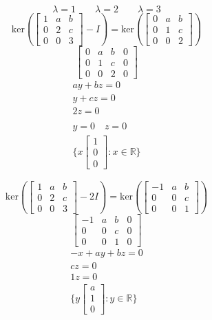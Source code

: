 \documentclass[hidelinks]{article}
\begin{document}
\[
	\lambda = 1 \quad \quad \lambda = 2 \quad \quad \lambda = 3
\]
\[
	\text{ker}(\begin{bmatrix} 1 & a & b \\ 0 & 2 & c \\ 0 & 0 & 3\end{bmatrix} - I) = \text{ker}(\begin{bmatrix} 0 & a & b \\ 0 & 1 & c \\ 0 & 0 & 2\end{bmatrix}) 
\]
\[
	\begin{bmatrix} 0 & a & b & 0 \\ 0 & 1 & c & 0\\ 0 & 0 & 2 & 0\end{bmatrix}
\]
\begin{align*}
	ay + bz = 0 \\
	y + cz = 0 \\
	2z = 0 \\
	\\
	y= 0 \quad z = 0 \\
	\{x \begin{bmatrix} 1 \\ 0 \\  0 \end{bmatrix} : x \in \mathbb{R}\}
\end{align*}

\[
	\text{ker}(\begin{bmatrix} 1 & a & b \\ 0 & 2 & c \\ 0 & 0 & 3\end{bmatrix} - 2I) = \text{ker}(\begin{bmatrix} -1 & a & b \\ 0 & 0 & c \\ 0 & 0 & 1\end{bmatrix}) 
\]
\[
	\begin{bmatrix} -1 & a & b & 0 \\ 0 & 0 & c & 0\\ 0 & 0 & 1 & 0\end{bmatrix}
\]
\begin{align*}
	-x + ay +bz = 0 \\
	cz = 0 \\
	1z = 0 \\
	\{y \begin{bmatrix} a \\ 1 \\  0 \end{bmatrix} : y \in \mathbb{R}\}
\end{align*}
\end{document}
